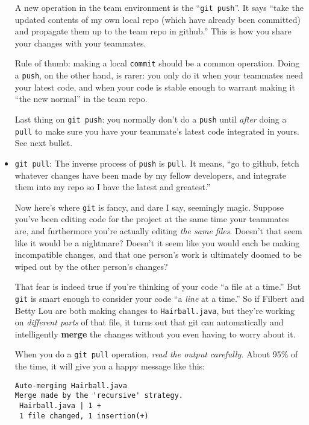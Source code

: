 \begin{itemize}
A new operation in the team environment is the ``\texttt{git push}''. It says
``take the updated contents of my own local repo (which have already been
committed) and propagate them up to the team repo in github.'' This is how you
share your changes with your teammates.

Rule of thumb: making a local \texttt{commit} should be a common operation.
Doing a \texttt{push}, on the other hand, is rarer: you only do it when your
teammates need your latest code, and when your code is stable enough to
warrant making it ``the new normal'' in the team repo.

Last thing on \texttt{git push}: you normally don't do a \texttt{push} until
\textit{after} doing a \texttt{pull} to make sure you have your teammate's
latest code integrated in yours. See next bullet.

\item \texttt{git pull}: The inverse process of \texttt{push} is
\texttt{pull}. It means, ``go to github, fetch whatever changes have been made
by my fellow developers, and integrate them into my repo so I have the latest
and greatest.''

Now here's where \texttt{git} is fancy, and dare I say, seemingly magic.
Suppose you've been editing code for the project at the same time your
teammates are, and furthermore you're actually editing \textit{the same
files}. Doesn't that seem like it would be a nightmare? Doesn't it seem like
you would each be making incompatible changes, and that one person's work is
ultimately doomed to be wiped out by the other person's changes?

That fear is indeed true if you're thinking of your code ``a file at a time.''
But \texttt{git} is smart enough to consider your code ``a \textit{line} at a
time.'' So if Filbert and Betty Lou are both making changes to
\texttt{Hairball.java}, but they're working on \textit{different parts} of
that file, it turns out that git can automatically and intelligently
\textbf{merge} the changes without you even having to worry about it.

When you do a \texttt{git pull} operation, \textit{read the output carefully.}
About 95\% of the time, it will give you a happy message like this:

\begin{Verbatim}[fontsize=\footnotesize,samepage=true,frame=none]
Auto-merging Hairball.java
Merge made by the 'recursive' strategy.
 Hairball.java | 1 +
 1 file changed, 1 insertion(+)
\end{Verbatim}


\end{itemize}
